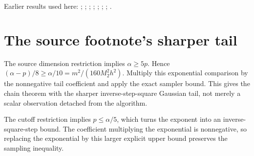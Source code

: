 \documentclass[11pt,a4paper]{article}
\begin{document}
Earlier results used here: \cite[Section~3.17.13]{LangevinLean2026ULASC}; \cite[Section~3.17.2]{LangevinLean2026ULASC}; \cite[Section~3.17.3]{LangevinLean2026ULASC}; \cite[Section~3.17.4]{LangevinLean2026ULASC}; \cite[Section~3.18.4]{LangevinLean2026ULASC}; \cite[Section~3.26.13]{LangevinLean2026ULASC}; \cite[Section~3.26.15]{LangevinLean2026ULASC}; \cite[Section~3.26.3]{LangevinLean2026ULASC}.

\section{\texorpdfstring{The source footnote’s sharper tail}{The source footnote’s sharper tail}}


The source dimension restriction implies \(\alpha\ge5p\). Hence \((\alpha-p)/8\ge\alpha/10=m^2/(160M_2^2h^2)\). Multiply this exponential comparison by the nonnegative tail coefficient and apply the exact sampler bound. This gives the chain theorem with the sharper inverse-step-square Gaussian tail, not merely a scalar observation detached from the algorithm.



The cutoff restriction implies \(p\le\alpha/5\), which turns the exponent into an inverse-square-step bound. The coefficient multiplying the exponential is nonnegative, so replacing the exponential by this larger explicit upper bound preserves the sampling inequality.
\end{document}
